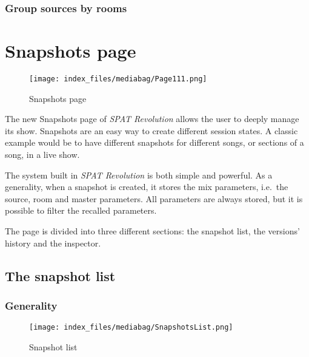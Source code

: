 \documentclass[
  letterpaper,
  DIV=11,
  numbers=noendperiod]{scrreport}
\begin{document}
\hypertarget{group-sources-by-rooms}{%
\subsection{Group sources by rooms}\label{group-sources-by-rooms}}

\hypertarget{snapshots-page}{%
\chapter{Snapshots page}\label{snapshots-page}}

\begin{figure}

{\centering \texttt{[image: index\_files/mediabag/Page111.png]}

}

\caption{Snapshots page}

\end{figure}

The new Snapshots page of \emph{SPAT Revolution} allows the user to
deeply manage its show. Snapshots are an easy way to create different
session states. A classic example would be to have different snapshots
for different songs, or sections of a song, in a live show.

The system built in \emph{SPAT Revolution} is both simple and powerful.
As a generality, when a snapshot is created, it stores the mix
parameters, i.e.~the source, room and master parameters. All parameters
are always stored, but it is possible to filter the recalled parameters.

The page is divided into three different sections: the snapshot list,
the versions' history and the inspector.

\hypertarget{the-snapshot-list}{%
\section{The snapshot list}\label{the-snapshot-list}}

\hypertarget{generality}{%
\subsection{Generality}\label{generality}}

\begin{figure}

{\centering \texttt{[image: index\_files/mediabag/SnapshotsList.png]}

}

\caption{Snapshot list}

\end{figure}
\end{document}
